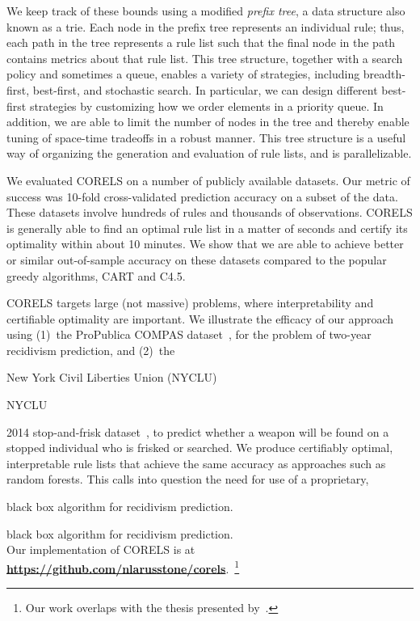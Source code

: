 We keep track of these bounds using a modified \emph{prefix tree},
a data structure also known as a trie.
%
Each node in the prefix tree represents an individual rule;
thus, each path in the tree represents a rule list such that
the final node in the path contains metrics about that rule list.
%
This tree structure, together with a search policy and sometimes a queue,
enables a variety of strategies, including breadth-first,
best-first, and stochastic search.
%
In particular, we can design different best-first strategies
by customizing how we order elements in a priority queue.
%
In addition, we are able to limit the number of nodes in the tree
and thereby enable tuning of space-time tradeoffs in a robust manner.
%
This tree structure is a useful way of organizing the generation
and evaluation of rule lists, and is parallelizable.

\begin{arxiv}
We evaluated CORELS on a number of publicly available datasets.
%
Our metric of success was 10-fold cross-validated prediction accuracy on a subset of the data.
%
These datasets involve hundreds of rules and thousands of observations.
%
CORELS is generally able to find an optimal rule list in a matter of seconds
and certify its optimality within about 10 minutes.
%
We show that we are able to achieve better or similar out-of-sample accuracy on these
datasets compared to the popular greedy algorithms, CART and C4.5.
\end{arxiv}

CORELS targets large (not massive) problems,
where interpretability and certifiable optimality are important.
%
We illustrate the efficacy of our approach using (1)~the ProPublica COMPAS dataset~\citep{LarsonMaKiAn16}, for the problem of two-year recidivism prediction,
and (2)~the
\begin{kdd}
New York Civil Liberties Union (NYCLU)
\end{kdd}
\begin{arxiv}
NYCLU
\end{arxiv}
2014 stop-and-frisk dataset~\citep{nyclu:2014}, to predict whether a weapon will be found
on a stopped individual who is frisked or searched.
%
We produce certifiably optimal, interpretable rule lists that achieve
the same accuracy as approaches such as random forests.
%
This calls into question the need for use of a proprietary,
\begin{kdd}
black box algorithm for recidivism prediction.
\end{kdd}
\begin{arxiv}
black box algorithm for recidivism prediction. \\

Our implementation of CORELS is at
\textbf{\url{https://github.com/nlarusstone/corels}}.~\footnote{Our work
overlaps with the thesis presented by~\citet{Larus-Stone17}.}
\end{arxiv}

%
%
%
%
